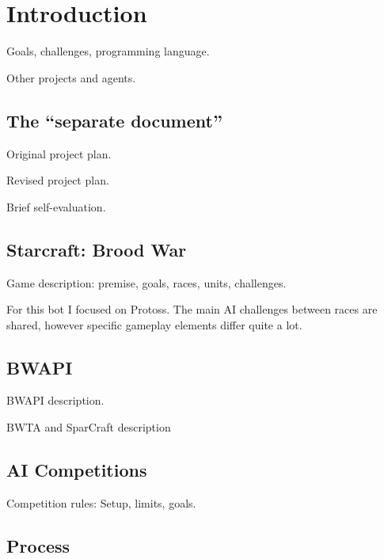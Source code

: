 \chapter{Introduction}

Goals, challenges, programming language.

Other projects and agents.

\section{The ``separate document''}
Original project plan.

Revised project plan.

Brief self-evaluation.

\section{Starcraft: Brood War}

Game description: premise, goals, races, units, challenges.

For this bot I focused on Protoss. The main AI challenges between races are shared, however specific gameplay elements differ quite a lot.

\section{BWAPI}

BWAPI description.

BWTA and SparCraft description

\section{AI Competitions}

Competition rules: Setup, limits, goals.

\section{Process}